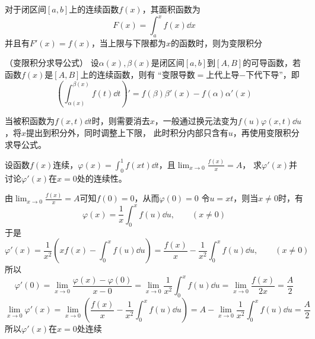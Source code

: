 对于闭区间$[a,b]$上的连续函数$f(x)$，其面积函数为
\[ F(x) = \int_a^xf(x)\dd{x} \]
并且有$F'(x)=f(x)$，当上限与下限都为$x$的函数时，则为变限积分
\begin{theorem}
    （变限积分求导公式）
    \label{th:变限积分求导公式}
    设$\alpha(x),\beta(x)$是闭区间$[a,b]$到$[A,B]$的可导函数，若函数$f(x)$是$[A,B]$上的连续函数，则有
    “变限导数$=$上代上导$-$下代下导”，即
    \[
        \left( \int_{\alpha(x)}^{\beta(x)}f(t)\dd{t} \right)'
        =
        f(\beta)\beta'(x) - f(\alpha)\alpha'(x)
    \]
\end{theorem}
当被积函数为$f(x,t)\dd{t}$时，则需要消去$x$，一般通过换元法变为$f(u)\varphi(x,t)\dd{u}$，将$x$提出到积分外，同时调整上下限，
此时积分内部只含有$u$，再使用变限积分求导公式。
\begin{example}
    设函数$f(x)$连续，$\displaystyle\varphi(x)=\int_0^1f(xt)\dd{t}$，且$\displaystyle\lim_{x\to 0}\frac{f(x)}{x}=A$，
    求$\varphi'(x)$并讨论$\varphi'(x)$在$x=0$处的连续性。
\end{example}
\begin{solution}
    由$\displaystyle\lim_{x\to 0}\frac{f(x)}{x}=A$可知$f(0)=0$，从而$\varphi(0)=0$
    令$u=xt$，则当$x\neq 0$时，有
    \[ \varphi(x) = \frac{1}{x}\int_0^x f(u)\dd{u} ,\qquad (x\neq 0)\]
    于是
    \[
        \varphi'(x)
        =
        \frac{1}{x^2}\left(xf(x) - \int_0^xf(u)\dd{u}\right)
        = \frac{f(x)}{x} - \frac{1}{x^2}\int_0^xf(u)\dd{u},\qquad (x\neq 0)
    \]
    所以
    \[
        \varphi'(0)
        =
        \lim_{x\to 0}\frac{\varphi(x)-\varphi(0)}{x-0}
        =
        \lim_{x\to 0}\frac{1}{x^2}\int_0^x f(u)\dd{u}
        =
        \lim_{x\to 0}\frac{f(x)}{2x}
        =
        \frac{A}{2}
    \]
    \[
        \lim_{x\to 0}\varphi'(x)
        =
        \lim_{x\to 0}\left(\frac{f(x)}{x} - \frac{1}{x^2}\int_0^xf(u)\dd{u}\right)
        =
        A -  \lim_{x\to 0}\frac{1}{x^2}\int_0^x f(u)\dd{u}
        =
        \frac{A}{2}
    \]
    所以$\varphi'(x)$在$x=0$处连续
\end{solution}

